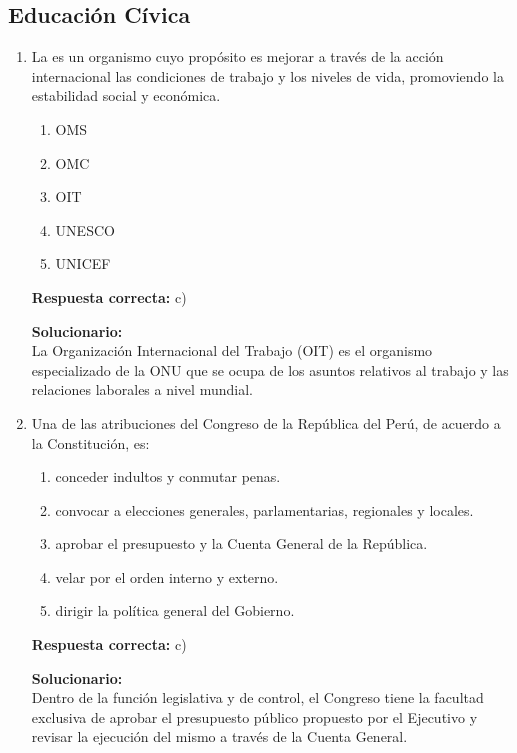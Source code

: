 \subsection*{Educación Cívica}

\begin{enumerate}
	
	\item La \underline{\hspace{3cm}} es un organismo cuyo propósito es mejorar a través de la acción internacional las condiciones de trabajo y los niveles de vida, promoviendo la estabilidad social y económica.
	\begin{enumerate}[label=\alph*)]
		\item OMS
		\item OMC
		\item OIT
		\item UNESCO
		\item UNICEF
	\end{enumerate}
	\textbf{Respuesta correcta:} c)
	
	\vspace{2mm}
	\textbf{Solucionario:}\\
	La Organización Internacional del Trabajo (OIT) es el organismo especializado de la ONU que se ocupa de los asuntos relativos al trabajo y las relaciones laborales a nivel mundial.
	
	\vspace{6mm}
	
	\item Una de las atribuciones del Congreso de la República del Perú, de acuerdo a la Constitución, es:
	\begin{enumerate}[label=\alph*)]
		\item conceder indultos y conmutar penas.
		\item convocar a elecciones generales, parlamentarias, regionales y locales.
		\item aprobar el presupuesto y la Cuenta General de la República.
		\item velar por el orden interno y externo.
		\item dirigir la política general del Gobierno.
	\end{enumerate}
	\textbf{Respuesta correcta:} c)
	
	\vspace{2mm}
	\textbf{Solucionario:}\\
	Dentro de la función legislativa y de control, el Congreso tiene la facultad exclusiva de aprobar el presupuesto público propuesto por el Ejecutivo y revisar la ejecución del mismo a través de la Cuenta General.
	
	\vspace{6mm}
	
\end{enumerate}


